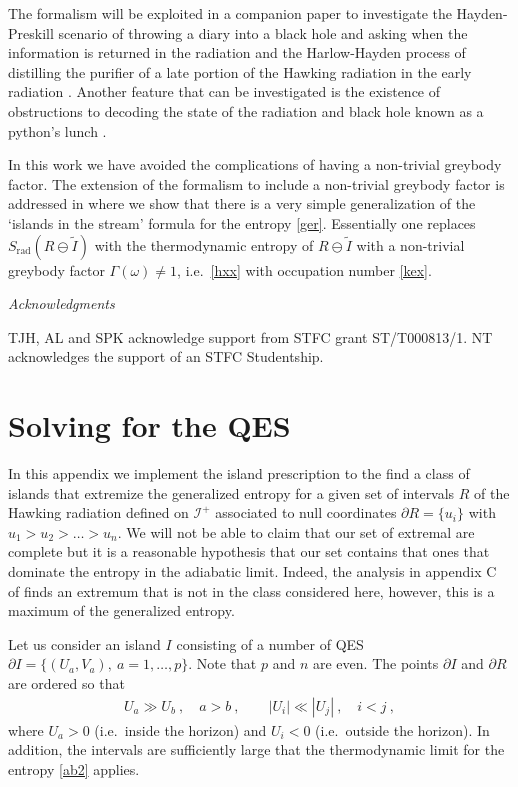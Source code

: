\documentclass[12pt]{article}
\newcommand{\EQ}[1]{\begin{equation}\begin{split} #1
\end{split}\end{equation}}
\begin{document}
The formalism will be exploited in a companion paper to investigate the Hayden-Preskill scenario of throwing a diary into a black hole and asking when the information is returned in the radiation \cite{Hayden:2007cs} and the Harlow-Hayden process of distilling the purifier of a late portion of the Hawking radiation in the early radiation \cite{Harlow:2013tf}. Another feature that can be investigated is the existence of obstructions to decoding the state of the radiation and black hole known as a python's lunch \cite{Brown:2019rox}.

In this work we have avoided the complications of having a non-trivial greybody factor. The extension of the formalism to include a non-trivial greybody factor is addressed in \cite{Grey} where we show that there is a very simple generalization of the `islands in the stream' formula for the entropy \eqref{ger}. Essentially one replaces $S_\text{rad}(R\ominus\tilde I)$ with the thermodynamic entropy of $R\ominus\tilde I$ with a non-trivial greybody factor $\Gamma(\omega)\neq1$, i.e.~\eqref{hxx} with occupation number \eqref{kex}.


\vspace{0.5cm}
\begin{center}{\it Acknowledgments}\end{center}
\vspace{0.2cm}
TJH, AL and SPK acknowledge support from STFC grant ST/T000813/1. NT acknowledges the support of an STFC Studentship.

\appendix
\appendixpage

\section{Solving for the QES}
\label{a1}


In this appendix we implement the island prescription to the find a class of islands that extremize the generalized entropy for a given set of intervals $R$ of the Hawking radiation defined on $\mathscr I^+$ associated to null coordinates $\partial R=\{u_i\}$ with $u_1>u_2>\ldots>u_n$. We will not be able to claim that our set of extremal are complete but it is a reasonable hypothesis that our set contains that ones that dominate the entropy in the adiabatic limit. Indeed, the analysis in  appendix C of \cite{Brown:2019rox} finds an extremum that is not in the class considered here, however, this is a maximum of the generalized entropy.

Let us consider an island $I$ consisting of a number of QES $\partial I=\{(U_a,V_a),\ a=1,\ldots,p\}$. Note that $p$ and $n$ are even. The points $\partial  I$ and $\partial R$ are ordered so that
\EQ{
U_a\gg U_b\ ,\quad a>b\ ,\qquad |U_i|\ll  |U_j|\ ,\quad i<j\ ,
\label{bxx}
}
where $U_a>0$ (i.e.~inside the horizon) and $U_i<0$ (i.e.~outside the horizon). In addition,  
the intervals are sufficiently large that the thermodynamic limit for the entropy \eqref{ab2} applies.
\end{document}
